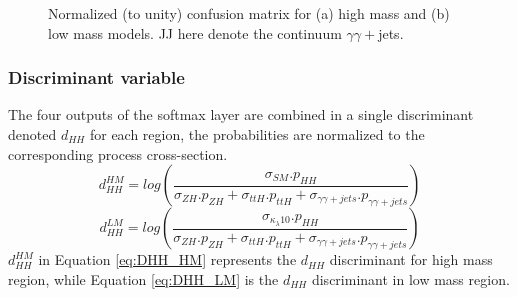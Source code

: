 \begin{figure}[htbp]
    \centering
    \begin{tcolorbox}[colback=black!5!white,colframe=white!75!black]
    \caption{Normalized (to unity) confusion matrix for (a) high mass and (b) low mass models. JJ here denote the continuum $\gamma\gamma+$jets.}
    \label{fig:HHyybb:ObjEvt:DNN:CM}
    \end{tcolorbox}
    
\end{figure}

\subsubsection{Discriminant variable}
The four outputs of the softmax layer are combined in a single discriminant denoted $d_{HH}$ for each region, the probabilities are normalized to the corresponding process cross-section.
\begin{equation}
    d_{HH}^{HM} = log \left(\frac{\sigma_{SM}.p_{HH}}{\sigma_{ZH}.p_{ZH}+\sigma_{ttH}.p_{ttH}+\sigma_{\gamma\gamma+jets}.p_{\gamma\gamma+jets}}\right)
    \label{eq:DHH_HM}
\end{equation}
\begin{equation}
    d_{HH}^{LM} = log \left(\frac{\sigma_{\kappa_\lambda10}.p_{HH}}{\sigma_{ZH}.p_{ZH}+\sigma_{ttH}.p_{ttH}+\sigma_{\gamma\gamma+jets}.p_{\gamma\gamma+jets}}\right)
    \label{eq:DHH_LM}
\end{equation}
$d_{HH}^{HM}$ in Equation \ref{eq:DHH_HM} represents the $d_{HH}$ discriminant for high mass region, while Equation \ref{eq:DHH_LM} is the $d_{HH}$ discriminant in low mass region. \\

